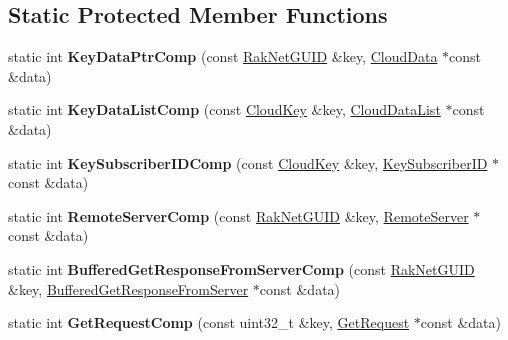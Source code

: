 \subsection*{Static Protected Member Functions}
\begin{DoxyCompactItemize}
\item 
\hypertarget{class_rak_net_1_1_cloud_server_ab90f4b8e79a43eaafcad6ad4e7c65e49}{static int {\bfseries Key\-Data\-Ptr\-Comp} (const \hyperlink{struct_rak_net_1_1_rak_net_g_u_i_d}{Rak\-Net\-G\-U\-I\-D} \&key, \hyperlink{struct_rak_net_1_1_cloud_server_1_1_cloud_data}{Cloud\-Data} $\ast$const \&data)}\label{class_rak_net_1_1_cloud_server_ab90f4b8e79a43eaafcad6ad4e7c65e49}

\item 
\hypertarget{class_rak_net_1_1_cloud_server_a86f84387eb1fb126d11d8a1a826c2259}{static int {\bfseries Key\-Data\-List\-Comp} (const \hyperlink{struct_rak_net_1_1_cloud_key}{Cloud\-Key} \&key, \hyperlink{struct_rak_net_1_1_cloud_server_1_1_cloud_data_list}{Cloud\-Data\-List} $\ast$const \&data)}\label{class_rak_net_1_1_cloud_server_a86f84387eb1fb126d11d8a1a826c2259}

\item 
\hypertarget{class_rak_net_1_1_cloud_server_a47ff529cae716ad1c24a6b4eeeb03b6a}{static int {\bfseries Key\-Subscriber\-I\-D\-Comp} (const \hyperlink{struct_rak_net_1_1_cloud_key}{Cloud\-Key} \&key, \hyperlink{struct_rak_net_1_1_cloud_server_1_1_key_subscriber_i_d}{Key\-Subscriber\-I\-D} $\ast$const \&data)}\label{class_rak_net_1_1_cloud_server_a47ff529cae716ad1c24a6b4eeeb03b6a}

\item 
\hypertarget{class_rak_net_1_1_cloud_server_adc0d986604ae825ecca5ac5e60ac591f}{static int {\bfseries Remote\-Server\-Comp} (const \hyperlink{struct_rak_net_1_1_rak_net_g_u_i_d}{Rak\-Net\-G\-U\-I\-D} \&key, \hyperlink{struct_rak_net_1_1_cloud_server_1_1_remote_server}{Remote\-Server} $\ast$const \&data)}\label{class_rak_net_1_1_cloud_server_adc0d986604ae825ecca5ac5e60ac591f}

\item 
\hypertarget{class_rak_net_1_1_cloud_server_a0a1f5191c033ff7cc53ab47cbb45ccd7}{static int {\bfseries Buffered\-Get\-Response\-From\-Server\-Comp} (const \hyperlink{struct_rak_net_1_1_rak_net_g_u_i_d}{Rak\-Net\-G\-U\-I\-D} \&key, \hyperlink{struct_rak_net_1_1_cloud_server_1_1_buffered_get_response_from_server}{Buffered\-Get\-Response\-From\-Server} $\ast$const \&data)}\label{class_rak_net_1_1_cloud_server_a0a1f5191c033ff7cc53ab47cbb45ccd7}

\item 
\hypertarget{class_rak_net_1_1_cloud_server_aed85feea2bae5166056f93b8c32be9c4}{static int {\bfseries Get\-Request\-Comp} (const uint32\-\_\-t \&key, \hyperlink{struct_rak_net_1_1_cloud_server_1_1_get_request}{Get\-Request} $\ast$const \&data)}\label{class_rak_net_1_1_cloud_server_aed85feea2bae5166056f93b8c32be9c4}

\end{DoxyCompactItemize}
